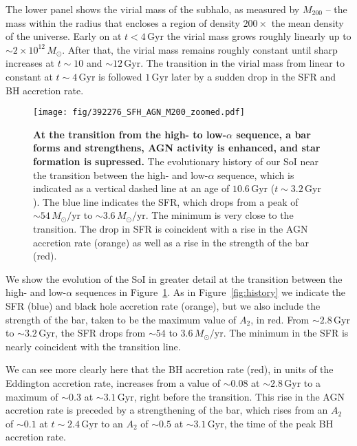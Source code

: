 \documentclass[linenumbers, twocolumn]{aastex631}
\newcommand{\Msun}{\ensuremath{M_{\odot}}}
\newcommand{\Gyr}{\ensuremath{\textrm{Gyr}}}
\newcommand{\Msunyr}{\ensuremath{\Msun/\textrm{yr}}}
\begin{document}
The lower panel shows the virial mass of the subhalo, as measured by $M_{200}$ -- the mass within the radius that encloses a region of density $200\times$ the mean density of the universe. Early on at $t<4\,\Gyr$ the virial mass grows roughly linearly up to $\sim2\times10^{12}\,\Msun$. After that, the virial mass remains roughly constant until sharp increases at $t\sim10$ and $\sim12\,\Gyr$. The transition in the virial mass from linear to constant at $t\sim4\,\Gyr$ is followed $1\,\Gyr$ later by a sudden drop in the SFR and BH accretion rate.

\begin{figure}
  \centering
  \texttt{[image: fig/392276\_SFH\_AGN\_M200\_zoomed.pdf]}
  \caption{\textbf{At the transition from the high- to low-$\alpha$ sequence, a bar forms and strengthens, AGN activity is enhanced, and star formation is supressed.} The evolutionary history of our SoI near the transition between the high- and low-$\alpha$ sequence, which is indicated as a vertical dashed line at an age of $10.6\,\Gyr$ ($t\sim3.2\,\Gyr$). The blue line indicates the SFR, which drops from a peak of $\sim54\,\Msunyr$ to $\sim3.6\,\Msunyr$. The minimum is very close to the transition. The drop in SFR is coincident with a rise in the AGN accretion rate (orange) as well as a rise in the strength of the bar (red).}
  \label{fig:history_zoom}
\end{figure}

We show the evolution of the SoI in greater detail at the transition between the high- and low-$\alpha$ sequences in Figure~\ref{fig:history_zoom}. As in Figure~\ref{fig:history} we indicate the SFR (blue) and black hole accretion rate (orange), but we also include the strength of the bar, taken to be the maximum value of $A_2$, in red. From $\sim2.8\,\Gyr$ to $\sim3.2\,\Gyr$, the SFR drops from $\sim54$ to $3.6\,\Msunyr$. The minimum in the SFR is nearly coincident with the transition line.

We can see more clearly here that the BH accretion rate (red), in units of the Eddington accretion rate, increases from a value of $\sim0.08$ at $\sim2.8\,\Gyr$ to a maximum of $\sim0.3$ at $\sim3.1\,\Gyr$, right before the transition. This rise in the AGN accretion rate is preceded by a strengthening of the bar, which rises from an $A_2$ of $\sim0.1$ at $t\sim2.4\,\Gyr$ to an $A_2$ of $\sim0.5$ at $\sim3.1\,\Gyr$, the time of the peak BH accretion rate.
\end{document}
